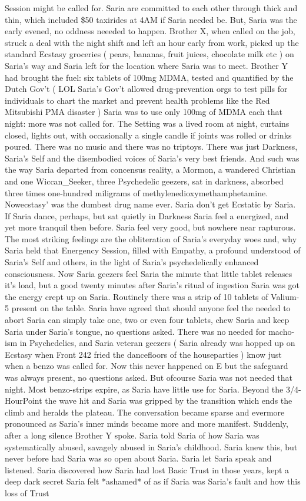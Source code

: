 \documentclass[12pt]{book}
\begin{document}
Session might be called for. Saria are committed to each other through thick and thin, which included \$50 taxirides at 4AM if Saria needed be. But, Saria was the early evened, no oddness neeeded to happen. Brother X, when called on the job, struck a deal with the night shift and left an hour early from work, picked up the standard Ecstasy groceries ( pears, bananas, fruit juices, chocolate milk etc ) on Saria's way and Saria left for the location where Saria was to meet. Brother Y had brought the fuel: six tablets of 100mg MDMA, tested and quantified by the Dutch Gov't ( LOL Saria's Gov't allowed drug-prevention orgs to test pills for individuals to chart the market and prevent health problems like the Red Mitsubishi PMA disaster ) Saria was to use only 100mg of MDMA each that night: more was not called for. The Setting was a lived room at night, curtains closed, lights out, with occasionally a single candle if joints was rolled or drinks poured. There was no music and there was no triptoys. There was just Darkness, Saria's Self and the disembodied voices of Saria's very best friends. And such was the way Saria departed from concensus reality, a Mormon, a wandered Christian and one Wiccan\_Seeker, three Psychedelic geezers, sat in darkness, absorbed three times one-hundred miligrams of methylenedioxymethamphetamine. Nowecstasy' was the dumbest drug name ever. Saria don't get Ecstatic by Saria. If Saria dance, perhaps, but sat quietly in Darkness Saria feel a energized, and yet more tranquil then before. Saria feel very good, but nowhere near rapturous. The most striking feelings are the obliteration of Saria's everyday woes and, why Saria held that Energency Session, filled with Empathy, a profound understood of Saria's Self and others, in the light of Saria's psychedelically enhanced consciousness. Now Saria geezers feel Saria the minute that little tablet releases it's load, but a good twenty minutes after Saria's ritual of ingestion Saria was got the energy crept up on Saria. Routinely there was a strip of 10 tablets of Valium-5 present on the table. Saria have agreed that should anyone feel the needed to abort Saria can simply take one, two or even four tablets, chew Saria and keep Saria under Saria's tongue, no questions asked. There was no needed for macho-ism in Psychedelics, and Saria veteran geezers ( Saria already was hopped up on Ecstasy when Front 242 fried the dancefloors of the houseparties ) know just when a benzo was called for. Now this never happened on E but the safeguard was always present, no questions asked. But ofcourse Saria was not needed that night. Most benzo-strips expire, as Saria have little use for Saria. Beyond the 3/4-HourPoint the wave hit and Saria was gripped by the transition which ends the climb and heralds the plateau. The conversation became sparse and evermore pronounced as Saria's inner minds became more and more manifest. Suddenly, after a long silence Brother Y spoke. Saria told Saria of how Saria was systematically abused, savagely abused in Saria's childhood. Saria knew this, but never before had Saria was so open about Saria. Saria let Saria speak and listened. Saria discovered how Saria had lost Basic Trust in those years, kept a deep dark secret Saria felt *ashamed* of as if Saria was Saria's fault and how this loss of Trust 
\end{document}
